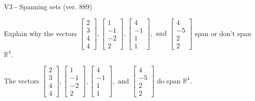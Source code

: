 \begin{exercise}
  \begin{exerciseTitle}V3 - Spanning sets (ver. 889)\end{exerciseTitle}
  \begin{exerciseStatement}
    Explain why the vectors \(\left[\begin{array}{r}
2 \\
3 \\
4 \\
4
\end{array}\right] , \left[\begin{array}{r}
1 \\
-1 \\
-2 \\
2
\end{array}\right] , \left[\begin{array}{r}
4 \\
-1 \\
1 \\
1
\end{array}\right] , \text{ and } \left[\begin{array}{r}
4 \\
-5 \\
2 \\
2
\end{array}\right]\) span or don't span \(\mathbb{R}^4\). 
	


  \end{exerciseStatement}
  \begin{exerciseAnswer}
   The vectors \(\left[\begin{array}{r}
2 \\
3 \\
4 \\
4
\end{array}\right] , \left[\begin{array}{r}
1 \\
-1 \\
-2 \\
2
\end{array}\right] , \left[\begin{array}{r}
4 \\
-1 \\
1 \\
1
\end{array}\right] , \text{ and } \left[\begin{array}{r}
4 \\
-5 \\
2 \\
2
\end{array}\right]\) 
  	 do  
	span \(\mathbb{R}^4\).
  


  \end{exerciseAnswer}
\end{exercise}